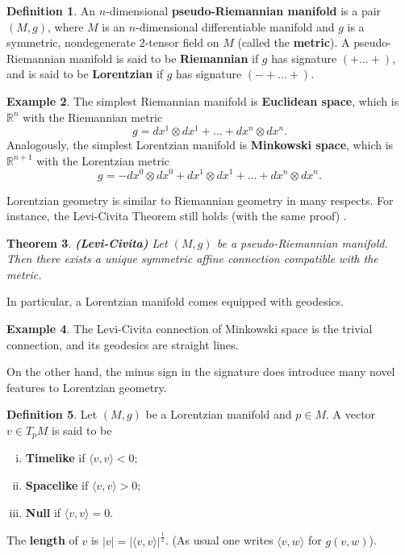 \documentclass[10pt]{amsart}
\newcommand{\bbR}{\mathbb{R}}      %
\newtheorem{Thm}{Theorem}[section]
\theoremstyle{definition}
\newtheorem{Def}[Thm]{Definition}
\newtheorem{Example}[Thm]{Example}
\theoremstyle{remark}
\begin{document}
\begin{Def}
An $n$-dimensional {\bf pseudo-Riemannian manifold} is a pair $(M,g)$, where $M$ is an $n$-dimensional differentiable manifold and $g$ is a symmetric, nondegenerate $2$-tensor field on $M$ (called the {\bf metric}). A pseudo-Riemannian manifold is said to be {\bf Riemannian} if $g$ has signature $(+ \ldots +)$, and is said to be {\bf Lorentzian} if $g$ has signature $(-+ \ldots +)$.
\end{Def}

\begin{Example}
The simplest Riemannian manifold is {\bf Euclidean space}, which is $\bbR^n$ with the Riemannian metric
\[
g = dx^1 \otimes dx^1 + \ldots + dx^n \otimes dx^n.
\]
Analogously, the simplest Lorentzian manifold is {\bf Minkowski space}, which is $\bbR^{n+1}$ with the Lorentzian metric
\[
g = -dx^0 \otimes dx^0 + dx^1 \otimes dx^1 + \ldots + dx^n \otimes dx^n.
\]
\end{Example}

Lorentzian geometry is similar to Riemannian geometry in many respects. For instance, the Levi-Civita Theorem still holds (with the same proof) .

\begin{Thm}
{\bf (Levi-Civita)} Let $(M,g)$ be a pseudo-Riemannian manifold. Then there exists a unique symmetric affine connection compatible with the metric.
\end{Thm}

In particular, a Lorentzian manifold comes equipped with geodesics.

\begin{Example}
The Levi-Civita connection of Minkowski space is the trivial connection, and its geodesics are straight lines.
\end{Example}

On the other hand, the minus sign in the signature does introduce many novel features to Lorentzian geometry.

\begin{Def}
Let $(M,g)$ be a Lorentzian manifold and $p \in M$. A vector $v \in T_pM$ is said to be
\begin{enumerate}[(i)]
\item
{\bf Timelike} if $\langle v, v \rangle < 0$;
\item
{\bf Spacelike} if $\langle v, v \rangle > 0$;
\item
{\bf Null} if $\langle v, v \rangle = 0$.
\end{enumerate}
The {\bf length} of $v$ is $|v|=|\langle v, v \rangle|^\frac12$. (As usual one writes $\langle v, w \rangle$ for $g(v,w)$).
\end{Def}
\end{document}
